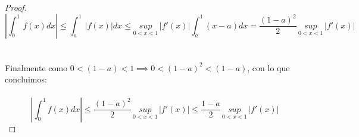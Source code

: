 \documentclass[11pt,letterpaper]{article}
\begin{document}
\begin{proof}
\begin{equation*}
    \left|\int_{0}^{1}\,f(x)dx\right|\leq\int_{a}^{1}\,|f(x)|dx\leq \underset{0<x<1}{sup}\,|f'(x)|\int_{a}^{1}(x-a)dx=\frac{(1-a)^2}{2}\,\underset{0<x<1}{sup}\,|f'(x)|
\end{equation*}\,\\
\,\\
Finalmente como $0<(1-a)<1\implies 0<(1-a)^2<(1-a)$, con lo que concluimos:\,\\
\,\\
\begin{equation*}
     \left|\int_{0}^{1}f(x)dx\right|\leq \frac{(1-a)^2}{2}\,\underset{0<x<1}{sup}\,|f'(x)|\leq \frac{1-a}{2}\, \underset{0<x<1}{sup}\,|f'(x)|
\end{equation*}
    
\end{proof}
\end{document}
